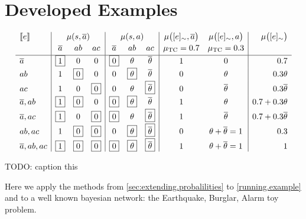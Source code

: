 \documentclass{article}
\newcommand{\at}[1]{\ensuremath{\!\del{#1}}}
\newcommand{\co}[1]{\ensuremath{\overline{#1}}}
\newcommand{\stablecore}[1]{\ensuremath{\left\llbracket #1 \right\rrbracket}}
\newcommand{\pw}[1]{\ensuremath{\mu\at{#1}}}
\newcommand{\pwcfname}{\ensuremath{\mu_{\textrm{TC}}}}
\newcommand{\class}[1]{\ensuremath{[{#1}]_{\sim}}}
\begin{document}
\section{Developed Examples}\label{sec:developed.examples}
%
%
\begin{table*}[t]
	\begin{equation*}
		\begin{array}{l|ccc|ccc|cc|r}
			\stablecore{e}
			 & \multicolumn{3}{c|}{\pw{s, \co{a}}}
			 & \multicolumn{3}{c|}{\pw{s, a}}
			 & \pw{\class{e}, \co{a}}
			 & \pw{\class{e}, a}
			 & \pw{\class{e}}
			\\[2pt]
			 & \co{a}                              & ab             & ac
			 & \co{a}                              & ab             & ac
			 & \pwcfname=0.7
			 & \pwcfname=0.3
			 &
			\\[2pt]
			\hline
			\co{a}
			 & \boxed{1}                           & 0              & 0
			 & \boxed{0}                           & \theta         & \co{\theta}
			 & 1
			 & 0
			 & 0.7
			\\[2pt]
			ab
			 & 1                                   & \boxed{0}      & 0
			 & 0                                   & \boxed{\theta} & \co{\theta}
			 & 0
			 & \theta
			 & 0.3\theta
			\\[2pt]
			ac
			 & 1                                   & 0              & \boxed{0}
			 & 0                                   & \theta         & \boxed{\co{\theta}}
			 & 0
			 & \co{\theta}
			 & 0.3\co{\theta}
			\\[2pt]
			\co{a}, ab
			 & \boxed{1}                           & \boxed{0}      & 0
			 & \boxed{0}                           & \boxed{\theta} & \co{\theta}
			 & 1
			 & \theta
			 & 0.7 + 0.3\theta
			\\[2pt]
			\co{a}, ac
			 & \boxed{1}                           & 0              & \boxed{0}
			 & \boxed{0}                           & \theta         & \boxed{\co{\theta}}
			 & 1
			 & \co{\theta}
			 & 0.7 + 0.3\co{\theta}
			\\[2pt]
			ab, ac
			 & 1                                   & \boxed{0}      & \boxed{0}
			 & 0                                   & \boxed{\theta} & \boxed{\co{\theta}}
			 & 0
			 & \theta + \co{\theta} = 1
			 & 0.3
			\\[2pt]
			\co{a}, ab, ac
			 & \boxed{1}                           & \boxed{0}      & \boxed{0}
			 & \boxed{0}                           & \boxed{\theta} & \boxed{\co{\theta}}
			 & 1
			 & \theta + \co{\theta} = 1
			 & 1
		\end{array}
	\end{equation*}

	\caption{TODO: caption this}\label{tab:sbf.classes}
\end{table*}
%
%
%
Here we apply the methods from \cref{sec:extending.probalilities} to
\cref{running.example} and to a well known bayesian network: the
Earthquake, Burglar, Alarm toy problem.
\end{document}

